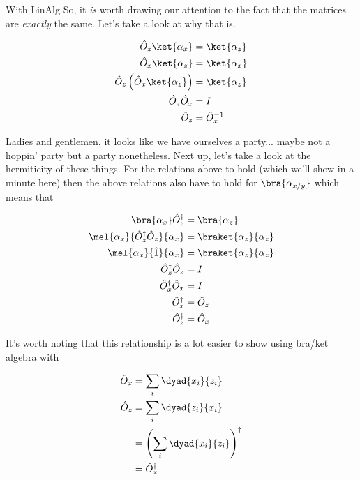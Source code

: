 \begin{answer}
\begin{answerpart}{With LinAlg}
    So, it \emph{is} worth drawing our attention to the fact that the
    matrices are \emph{exactly} the same.  Let's take a look at why
    that is.

    \begin{equation}
      \begin{split}
        \hat{O}_z\ket{\alpha_x} &= \ket{\alpha_z}\\
        \hat{O}_x\ket{\alpha_z} &= \ket{\alpha_x}\\
        \hat{O}_z\left(\hat{O}_x\ket{\alpha_z}\right) &= \ket{\alpha_z}\\
        \hat{O}_z\hat{O}_x &= I\\
        \hat{O}_z &= \hat{O}_{x}^{-1}\\
      \end{split}
    \end{equation}

    Ladies and gentlemen, it looks like we have ourselves a
    party... maybe not a hoppin' party but a party nonetheless.  Next
    up, let's take a look at the hermiticity of these things.  For the
    relations above to hold (which we'll show in a minute here) then
    the above relations also have to hold for $\bra{\alpha_{x/y}}$
    which means that

    \begin{equation}
      \begin{split}
        \bra{\alpha_x}\hat{O}_z^\dagger &= \bra{\alpha_z}\\
        \mel{\alpha_x}{\hat{O}_z^\dagger\hat{O}_z}{\alpha_x} &= \braket{\alpha_z}{\alpha_z}\\
        \mel{\alpha_x}{\hat{1}}{\alpha_x} &= \braket{\alpha_z}{\alpha_z}\\
        \hat{O}_z^\dagger\hat{O}_z &= I\\
        \hat{O}_x^\dagger\hat{O}_x &= I\\
        \hat{O}_x^\dagger &= \hat{O}_z\\
        \hat{O}_z^\dagger &= \hat{O}_x\\
      \end{split}
    \end{equation}

    It's worth noting that this relationship is a lot easier to show
    using bra/ket algebra with

    \begin{equation}
      \begin{split}
        \hat{O}_x &= \sum_i \dyad{x_i}{z_i}\\
        \hat{O}_z &= \sum_i \dyad{z_i}{x_i}\\
        &= \left(\sum_i \dyad{x_i}{z_i}\right)^\dagger\\
        &= \hat{O}_x^\dagger\\
      \end{split}
    \end{equation}


\end{answerpart}
\end{answer}
